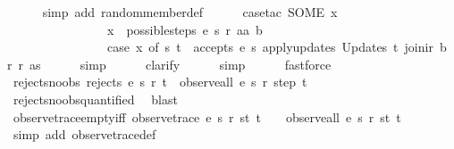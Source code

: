 \begin{isabellebody}
\ \ \ \ \isamarkupfalse%
\ {\isacharparenleft}simp\ add{\isacharcolon}\ random{\isacharunderscore}member{\isacharunderscore}def{\isacharparenright}\isanewline
\ \ \ \ \isamarkupfalse%
\ {\isacharparenleft}case{\isacharunderscore}tac\ {\isachardoublequoteopen}SOME\ x{\isachardot}\isanewline
\ \ \ \ \ \ \ \ \ \ \ \ \ \ \ \ x\ {\isacharbar}{\isasymin}{\isacharbar}\ possible{\isacharunderscore}steps\ e\ s\ r\ aa\ b\ {\isasymand}\isanewline
\ \ \ \ \ \ \ \ \ \ \ \ \ \ \ \ {\isacharparenleft}case\ x\ of\ {\isacharparenleft}s{\isacharprime}{\isacharcomma}\ t{\isacharparenright}\ {\isasymRightarrow}\ accepts\ e\ s{\isacharprime}\ {\isacharparenleft}apply{\isacharunderscore}updates\ {\isacharparenleft}Updates\ t{\isacharparenright}\ {\isacharparenleft}join{\isacharunderscore}ir\ b\ r{\isacharparenright}\ r{\isacharparenright}\ as{\isacharparenright}{\isachardoublequoteclose}{\isacharparenright}\isanewline
\ \ \ \ \isamarkupfalse%
\ simp\isanewline
\ \ \ \ \isamarkupfalse%
\ clarify\isanewline
\ \ \ \ \isamarkupfalse%
\ simp\isanewline
\ \ \ \ \isamarkupfalse%
\ fastforce\isanewline
{}\isamarkupfalse%
%
\endisatagproof
{\isafoldproof}%
%
\isadelimproof
\isanewline
%
\endisadelimproof
\isanewline
{}\isamarkupfalse%
\ rejects{\isacharunderscore}no{\isacharunderscore}obs{\isacharcolon}\ {\isachardoublequoteopen}rejects\ e\ s\ r\ t\ {\isasymLongrightarrow}\ observe{\isacharunderscore}all\ e\ s\ r\ step\ t\ {\isacharequal}\ {\isacharbrackleft}{\isacharbrackright}{\isachardoublequoteclose}\isanewline
%
\isadelimproof
\ \ %
\endisadelimproof
%
\isatagproof
{}\isamarkupfalse%
\ rejects{\isacharunderscore}no{\isacharunderscore}obs{\isacharunderscore}quantified\ \isamarkupfalse%
\ blast%
\endisatagproof
{\isafoldproof}%
%
\isadelimproof
\isanewline
%
\endisadelimproof
\isanewline
{}\isamarkupfalse%
\ observe{\isacharunderscore}trace{\isacharunderscore}empty{\isacharunderscore}iff{\isacharcolon}\ {\isachardoublequoteopen}{\isacharparenleft}observe{\isacharunderscore}trace\ e\ s\ r\ st\ t\ {\isacharequal}\ {\isacharbrackleft}{\isacharbrackright}{\isacharparenright}\ {\isacharequal}\ {\isacharparenleft}observe{\isacharunderscore}all\ e\ s\ r\ st\ t\ {\isacharequal}\ {\isacharbrackleft}{\isacharbrackright}{\isacharparenright}{\isachardoublequoteclose}\isanewline
%
\isadelimproof
\ \ %
\endisadelimproof
%
\isatagproof
{}\isamarkupfalse%
\ {\isacharparenleft}simp\ add{\isacharcolon}\ observe{\isacharunderscore}trace{\isacharunderscore}def{\isacharparenright}%
\endisatagproof
{\isafoldproof}%
%
\isadelimproof
\isanewline
%
\endisadelimproof
%
\isadelimtheory
\isanewline
%
\endisadelimtheory
%
\isatagtheory
{}\isamarkupfalse%
%
\endisatagtheory
{\isafoldtheory}%
%
\isadelimtheory
%
\endisadelimtheory
%
\end{isabellebody}%

